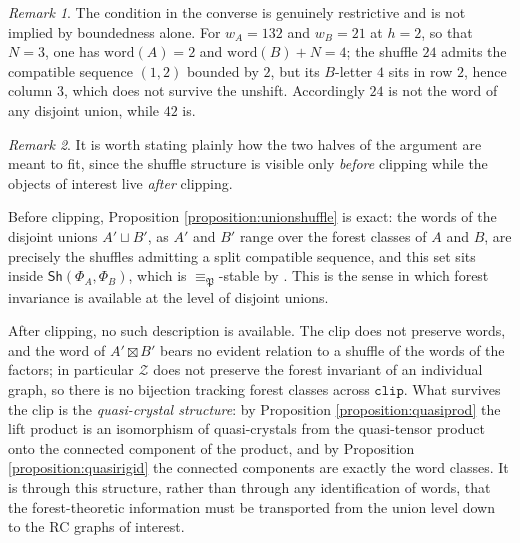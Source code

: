 \documentclass{amsart}
\theoremstyle{definition}
\theoremstyle{remark}
\newtheorem*{remark}{Remark}
\numberwithin{equation}{subsection}
\newcommand{\wof}[1]{w_{#1}}
\newcommand{\zeromap}{\mathcal{Z}}
\newcommand{\clp}{\mathtt{clip}}
\newcommand{\forest}{\mathfrak{P}}
\begin{document}
\begin{remark}
The condition in the converse is genuinely restrictive and is not implied by boundedness alone. For $\wof A=132$ and $\wof B=21$ at $h=2$, so that $N=3$, one has $\mathrm{word}(A)=2$ and $\mathrm{word}(B)+N=4$; the shuffle $24$ admits the compatible sequence $(1,2)$ bounded by $2$, but its $B$-letter $4$ sits in row $2$, hence column $3$, which does not survive the unshift. Accordingly $24$ is not the word of any disjoint union, while $42$ is.
\end{remark}

\begin{remark}\label{remark:shufflestrategy}
It is worth stating plainly how the two halves of the argument are meant to fit, since the shuffle structure is visible only \emph{before} clipping while the objects of interest live \emph{after} clipping.

Before clipping, Proposition \ref{proposition:unionshuffle} is exact: the words of the disjoint unions $A'\sqcup B'$, as $A'$ and $B'$ range over the forest classes of $A$ and $B$, are precisely the shuffles admitting a split compatible sequence, and this set sits inside $\mathsf{Sh}(\Phi_A,\Phi_B)$, which is $\equiv_\forest$-stable by \cite[Theorem~6.3]{nadeau2024forest}. This is the sense in which forest invariance is available at the level of disjoint unions.

After clipping, no such description is available. The clip does not preserve words, and the word of $A'\boxtimes B'$ bears no evident relation to a shuffle of the words of the factors; in particular $\zeromap$ does not preserve the forest invariant of an individual graph, so there is no bijection tracking forest classes across $\clp$. What survives the clip is the \emph{quasi-crystal structure}: by Proposition \ref{proposition:quasiprod} the lift product is an isomorphism of quasi-crystals from the quasi-tensor product onto the connected component of the product, and by Proposition \ref{proposition:quasirigid} the connected components are exactly the word classes. It is through this structure, rather than through any identification of words, that the forest-theoretic information must be transported from the union level down to the RC graphs of interest.
\end{remark}
\end{document}
